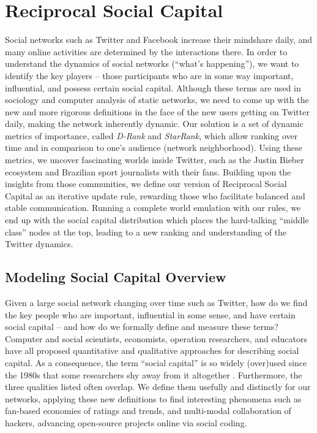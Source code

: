 \documentclass[10pt,oneside]{memoir}
\begin{document}
\chapter{Reciprocal Social Capital}
\label{reciprocalsocialcapital}

\label{chapter:SocialCapital}


Social networks such as Twitter and Facebook increase their mindshare daily, and many online activities are determined by the interactions there. In order to understand the dynamics of social networks (``what's happening''), we want to identify the key players -- those participants who are in some way important, influential, and possess certain social capital. Although these terms are used in sociology and computer analysis of static networks, we need to come up with the new and more rigorous definitions in the face of the new users getting on Twitter daily, making the network inherently dynamic. Our solution is a set of dynamic metrics of importance, called {\itshape D-Rank} and {\itshape StarRank}, which allow ranking over time and in comparison to one's audience (network neighborhood). Using these metrics, we uncover fascinating worlds inside Twitter, such as the Justin Bieber ecosystem and Brazilian sport journalists with their fans. Building upon the insights from those communities, we define our version of Reciprocal Social Capital as an iterative update rule, rewarding those who facilitate balanced and stable communication. Running a complete world emulation with our rules, we end up with the social capital distribution which places the hard-talking ``middle class'' nodes at the top, leading to a new ranking and understanding of the Twitter dynamics.


\pagebreak \section{Modeling Social Capital Overview}
\label{modelingsocialcapitaloverview}

Given a large social network changing over time such as Twitter, how do we find the key people who are important, influential in some sense, and have certain social capital -- and how do we formally define and measure these terms? Computer and social scientists, economists, operation researchers, and educators have all proposed quantitative and qualitative approaches for describing social capital. As a consequence, the term ``social capital'' is so widely (over)used since the 1980s that some researchers shy away from it altogether \cite{jackson2008social}. Furthermore, the three qualities listed often overlap. We define them usefully and distinctly for our networks, applying these new definitions to find interesting phenomena such as fan-based economies of ratings and trends, and multi-modal collaboration of hackers, advancing open-source projects online via social coding.
\end{document}
